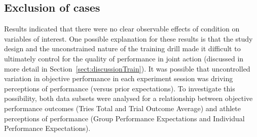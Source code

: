 





\subsection{Exclusion of cases}
Results indicated that there were no clear observable effects of condition on variables of interest.  One possible explanation for these results is that the study design and the unconstrained nature of the training drill made it difficult to ultimately control for the quality of performance in joint action (discussed in more detail in Section~\ref{sect:discussionTrain}).  It was possible that uncontrolled variation in objective performance in each experiment session was driving perceptions of performance (versus prior expectations).  To investigate this possibility, both data subsets were analysed for a relationship between objective performance outcomes (Tries Total and Trial Outcome Average) and athlete perceptions of performance (Group Performance Expectations and Individual Performance Expectations).

